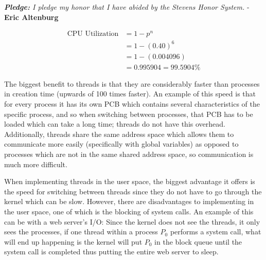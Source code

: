 \newcommand\NAME{Eric Altenburg}  %
\newcommand\COURSE{CS 492}
\newcommand\HWNUM{1}              %


\begin{center}
	\textit{\textbf{Pledge:} I pledge my honor that I have abided by the Stevens Honor System.} - \textbf{\NAME}
\end{center}


	\begin{align*}
		\text{CPU Utilization} &= 1 - p^{n}\\
		&= 1- (0.40)^{6}\\
		&= 1 - (0.004096)\\
		&= 0.995904 = 99.5904\%
	\end{align*}

	The biggest benefit to threads is that they are considerably faster than processes in creation time (upwards of 100 times faster). An example of this speed is that for every process it has its own PCB which contains several characteristics of the specific process, and so when switching between processes, that PCB has to be loaded which can take a long time; threads do not have this overhead. Additionally, threads share the same address space which allows them to communicate more easily (specifically with global variables) as opposed to processes which are not in the same shared address space, so communication is much more difficult. \par
	When implementing threads in the user space, the biggest advantage it offers is the speed for switching between threads since they do not have to go through the kernel which can be slow. However, there are disadvantages to implementing in the user space, one of which is the blocking of system calls. An example of this can be with a web server's I/O: Since the kernel does not see the threads, it only sees the processes, if one thread within a process $P_{0}$ performs a system call, what will end up happening is the kernel will put $P_{0}$ in the block queue until the system call is completed thus putting the entire web server to sleep.

